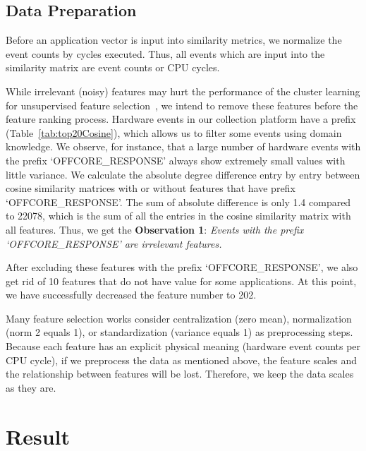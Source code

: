 \documentclass[conference]{IEEEtran}
\begin{document}
\subsection{Data Preparation}
\label{sec:prep}
Before an application vector is input into similarity metrics, we normalize the event counts by cycles executed. Thus, all events which are input into the similarity matrix are event counts or CPU cycles.

While irrelevant (noisy) features may hurt the performance of the cluster learning for unsupervised feature selection~\cite{lindenbaum2021differentiable}, we intend to remove these features before the feature ranking process. %
Hardware events in our collection platform have a prefix (Table~\ref{tab:top20Cosine}), which allows us to filter some events using domain knowledge.
We observe, for instance, that a large number of hardware events with the prefix `OFFCORE\_RESPONSE' always show extremely small values with little variance. We calculate the absolute degree difference entry by entry between cosine similarity matrices with or without features that have prefix `OFFCORE\_RESPONSE'. The sum of absolute difference is only 1.4 compared to 22078, which is the sum of all the entries in the cosine similarity matrix with all features. Thus, we get the \textbf{Observation 1}: 
\textit{Events with the prefix `OFFCORE\_RESPONSE' are irrelevant features.} 

After excluding these features with the prefix `OFFCORE\_RESPONSE', we also get rid of 10 features that do not have value for some applications. At this point, we have successfully decreased the feature number to 202. 

Many feature selection works consider centralization (zero mean), normalization (norm 2 equals 1), or standardization (variance equals 1) as preprocessing steps. Because each feature has an explicit physical meaning (hardware event counts per CPU cycle), if we preprocess the data as mentioned above, the feature scales and the relationship between features will be lost. Therefore, we keep the data scales as they are.


\section{Result}
\end{document}
